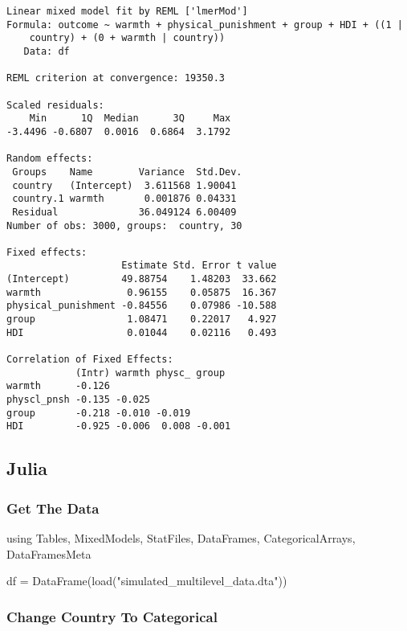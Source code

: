 \documentclass[
  letterpaper,
  DIV=11,
  numbers=noendperiod]{scrreprt}
\newenvironment{Shaded}{\begin{snugshade}}{\end{snugshade}}
\newcommand{\BuiltInTok}[1]{\textcolor[rgb]{0.00,0.23,0.31}{#1}}
\newcommand{\FunctionTok}[1]{\textcolor[rgb]{0.28,0.35,0.67}{#1}}
\newcommand{\ImportTok}[1]{\textcolor[rgb]{0.00,0.46,0.62}{#1}}
\newcommand{\NormalTok}[1]{\textcolor[rgb]{0.00,0.23,0.31}{#1}}
\newcommand{\OperatorTok}[1]{\textcolor[rgb]{0.37,0.37,0.37}{#1}}
\newcommand{\StringTok}[1]{\textcolor[rgb]{0.13,0.47,0.30}{#1}}
\begin{document}
\begin{verbatim}
Linear mixed model fit by REML ['lmerMod']
Formula: outcome ~ warmth + physical_punishment + group + HDI + ((1 |  
    country) + (0 + warmth | country))
   Data: df

REML criterion at convergence: 19350.3

Scaled residuals: 
    Min      1Q  Median      3Q     Max 
-3.4496 -0.6807  0.0016  0.6864  3.1792 

Random effects:
 Groups    Name        Variance  Std.Dev.
 country   (Intercept)  3.611568 1.90041 
 country.1 warmth       0.001876 0.04331 
 Residual              36.049124 6.00409 
Number of obs: 3000, groups:  country, 30

Fixed effects:
                    Estimate Std. Error t value
(Intercept)         49.88754    1.48203  33.662
warmth               0.96155    0.05875  16.367
physical_punishment -0.84556    0.07986 -10.588
group                1.08471    0.22017   4.927
HDI                  0.01044    0.02116   0.493

Correlation of Fixed Effects:
            (Intr) warmth physc_ group 
warmth      -0.126                     
physcl_pnsh -0.135 -0.025              
group       -0.218 -0.010 -0.019       
HDI         -0.925 -0.006  0.008 -0.001
\end{verbatim}

\subsection{Julia}

\subsubsection{Get The Data}\label{get-the-data-2}

\begin{Shaded}
\begin{Highlighting}[]
\ImportTok{using} \BuiltInTok{Tables}\NormalTok{, }\BuiltInTok{MixedModels}\NormalTok{, }\BuiltInTok{StatFiles}\NormalTok{, }\BuiltInTok{DataFrames}\NormalTok{, }\BuiltInTok{CategoricalArrays}\NormalTok{, }\BuiltInTok{DataFramesMeta}

\NormalTok{df }\OperatorTok{=} \FunctionTok{DataFrame}\NormalTok{(}\FunctionTok{load}\NormalTok{(}\StringTok{"simulated\_multilevel\_data.dta"}\NormalTok{))}
\end{Highlighting}
\end{Shaded}

\subsubsection{Change Country To
Categorical}\label{change-country-to-categorical}
\end{document}
